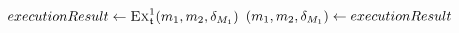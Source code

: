 \begin{algorithmic}[1]
        \algindentskip
            \State \Return{$\bot$}
        \EndIf
        \algblockskip

            \State $executionResult \gets \textsc{Ex}_{\mathfrak{t}}^1(m_{1}, m_{2}, \delta_{M_{1}})$
                \State \Return{$\bot$} \label{algo:synchronization:execute_bidirectional_transformation:line:returnbot}
            \Else
                \State $(m_{1}, m_{2}, \delta_{M_{1}}) \gets executionResult$
            \EndIf
        \EndWhile
        \algblockskip

        \State {} \label{algo:synchronization:execute_bidirectional_transformation:line:returnresult}
        \algindentskip
    \EndProcedure
\end{algorithmic}